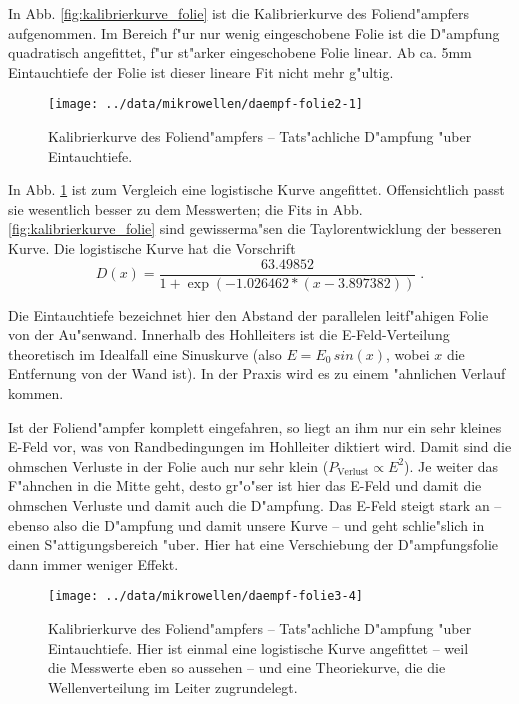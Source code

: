 \documentclass[a4paper,12pt]{article}
\begin{document}
In Abb. \ref{fig:kalibrierkurve_folie} ist die Kalibrierkurve des
Foliend"ampfers aufgenommen. Im Bereich f"ur nur wenig eingeschobene
Folie ist die D"ampfung quadratisch angefittet, f"ur st"arker
eingeschobene Folie linear. Ab ca. 5mm Eintauchtiefe der Folie ist
dieser lineare Fit nicht mehr g"ultig.

\begin{figure}[!h]
  \centering
 \texttt{[image: ../data/mikrowellen/daempf-folie2-1]} 
  \caption{Kalibrierkurve des Foliend"ampfers -- Tats"achliche
    D"ampfung "uber Eintauchtiefe.}
  \label{fig:kalibrierkurve_folie_logistisch}
\end{figure}



In Abb. \ref{fig:kalibrierkurve_folie_logistisch} ist zum Vergleich
eine logistische Kurve angefittet. Offensichtlich passt sie wesentlich
besser zu dem Messwerten; die Fits in
Abb. \ref{fig:kalibrierkurve_folie} sind gewisserma"sen die
Taylorentwicklung der besseren Kurve. Die logistische Kurve hat die Vorschrift
\begin{equation}
\label{eq:kalibr_foliendaempfer}
  D(x) =
\frac{ 63.49852 }{ 1 + \exp( - 1.026462 * ( x - 3.897382 ) ) } \;.
\end{equation}

Die Eintauchtiefe bezeichnet hier den Abstand der parallelen
leitf"ahigen Folie von der Au"senwand. Innerhalb des Hohlleiters ist
die E-Feld-Verteilung theoretisch im Idealfall eine Sinuskurve (also
$E = E_0 \, sin(x)$, wobei $x$ die Entfernung von der Wand ist). In
der Praxis wird es zu einem "ahnlichen Verlauf kommen.

Ist der Foliend"ampfer komplett eingefahren, so liegt an ihm nur ein
sehr kleines E-Feld vor, was von Randbedingungen im Hohlleiter
diktiert wird. Damit sind die ohmschen Verluste in der Folie
auch nur sehr klein ($P_\text{Verlust} \propto E^2$). Je weiter das
F"ahnchen in die Mitte geht, desto gr"o"ser ist hier das E-Feld und
damit die ohmschen Verluste und damit auch die D"ampfung. Das E-Feld
steigt stark an -- ebenso also die D"ampfung und damit unsere Kurve --
und geht schlie"slich in einen S"attigungsbereich "uber. Hier hat
eine Verschiebung der D"ampfungsfolie dann immer weniger Effekt.

\begin{figure}[!h]
  \centering
 \texttt{[image: ../data/mikrowellen/daempf-folie3-4]} 
  \caption{Kalibrierkurve des Foliend"ampfers -- Tats"achliche
    D"ampfung "uber Eintauchtiefe. Hier ist einmal eine logistische
    Kurve angefittet -- weil die Messwerte eben so aussehen -- und
    eine Theoriekurve, die die Wellenverteilung im Leiter zugrundelegt.}
  \label{fig:kalibrierkurve_folie_sinus}
\end{figure}
\end{document}
